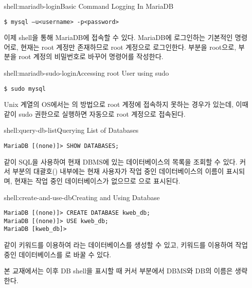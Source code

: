\begin{shellenv}{shell:mariadb-login}{Basic Command Logging In MariaDB}\begin{verbatim}
$ mysql –u<username> -p<password>
\end{verbatim}
\end{shellenv}

이제 shell을 통해 MariaDB에 접속할 수 있다. \은 MariaDB에 로그인하는 기본적인 명령어로, 현재는 root 계정만 존재하므로 root 계정으로 로그인한다.  부분을 root으로,  부분을 root 계정의 비밀번호로 바꾸어 명령어를 작성한다.

\begin{shellenv}{shell:mariadb-sudo-login}{Accessing root User using sudo}\begin{verbatim}
$ sudo mysql
\end{verbatim}
\end{shellenv}

Unix 계열의 OS에서는 의 방법으로 root 계정에 접속하지 못하는 경우가 있는데, 이때 \과 같이 sudo 권한으로 실행하면 자동으로 root 계정으로 접속된다.

\begin{shellenv}{shell:query-db-list}{Querying List of Databases}\begin{verbatim}
MariaDB [(none)]> SHOW DATABASES;
\end{verbatim}
\end{shellenv}

\와 같이 SQL을 사용하여 현재 DBMS에 있는 데이터베이스의 목록을 조회할 수 있다. 커서 부분의 대괄호(\cd{[]}) 내부에는 현재 사용자가 작업 중인 데이터베이스의 이름이 표시되며, 현재는 작업 중인 데이터베이스가 없으므로 으로 표시된다.

\begin{shellenv}{shell:create-and-use-db}{Creating and Using Database}\begin{verbatim}
MariaDB [(none)]> CREATE DATABASE kweb_db;
MariaDB [(none)]> USE kweb_db;
MariaDB [kweb_db]>
\end{verbatim}
\end{shellenv}

\와 같이  키워드를 이용하여 라는 데이터베이스를 생성할 수 있고,  키워드를 이용하여 작업 중인 데이터베이스를 로 바꿀 수 있다.

본 교재에서는 이후 DB shell을 표시할 때 커서 부분에서 DBMS와 DB의 이름은 생략한다.

